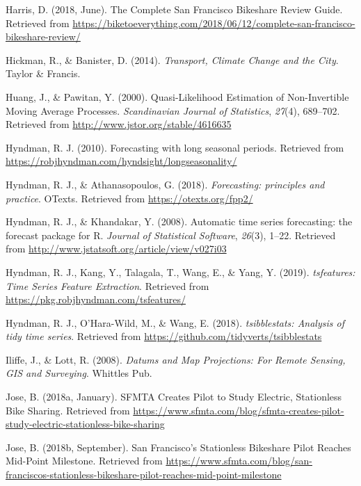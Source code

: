 \documentclass[12pt,oneside]{reedthesis}
\begin{document}
\hypertarget{ref-harris2018}{}
Harris, D. (2018, June). The Complete San Francisco Bikeshare Review
Guide. Retrieved from
\url{https://biketoeverything.com/2018/06/12/complete-san-francisco-bikeshare-review/}

\hypertarget{ref-hickman2014}{}
Hickman, R., \& Banister, D. (2014). \emph{Transport, Climate Change and
the City}. Taylor \& Francis.

\hypertarget{ref-huang2000}{}
Huang, J., \& Pawitan, Y. (2000). Quasi-Likelihood Estimation of
Non-Invertible Moving Average Processes. \emph{Scandinavian Journal of
Statistics}, \emph{27}(4), 689--702. Retrieved from
\url{http://www.jstor.org/stable/4616635}

\hypertarget{ref-hyndmanblog}{}
Hyndman, R. J. (2010). Forecasting with long seasonal periods. Retrieved
from \url{https://robjhyndman.com/hyndsight/longseasonality/}

\hypertarget{ref-hyndman2018fpp}{}
Hyndman, R. J., \& Athanasopoulos, G. (2018). \emph{Forecasting:
principles and practice}. OTexts. Retrieved from
\url{https://otexts.org/fpp2/}

\hypertarget{ref-forecast}{}
Hyndman, R. J., \& Khandakar, Y. (2008). Automatic time series
forecasting: the forecast package for R. \emph{Journal of Statistical
Software}, \emph{26}(3), 1--22. Retrieved from
\url{http://www.jstatsoft.org/article/view/v027i03}

\hypertarget{ref-tsfeatures}{}
Hyndman, R. J., Kang, Y., Talagala, T., Wang, E., \& Yang, Y. (2019).
\emph{tsfeatures: Time Series Feature Extraction}. Retrieved from
\url{https://pkg.robjhyndman.com/tsfeatures/}

\hypertarget{ref-tsibblestats}{}
Hyndman, R. J., O'Hara-Wild, M., \& Wang, E. (2018). \emph{tsibblestats:
Analysis of tidy time series}. Retrieved from
\url{https://github.com/tidyverts/tsibblestats}

\hypertarget{ref-iliffe2008}{}
Iliffe, J., \& Lott, R. (2008). \emph{Datums and Map Projections: For
Remote Sensing, GIS and Surveying}. Whittles Pub.

\hypertarget{ref-sfmta2018one}{}
Jose, B. (2018a, January). SFMTA Creates Pilot to Study Electric,
Stationless Bike Sharing. Retrieved from
\url{https://www.sfmta.com/blog/sfmta-creates-pilot-study-electric-stationless-bike-sharing}

\hypertarget{ref-sfmta2018two}{}
Jose, B. (2018b, September). San Francisco's Stationless Bikeshare Pilot
Reaches Mid-Point Milestone. Retrieved from
\url{https://www.sfmta.com/blog/san-franciscos-stationless-bikeshare-pilot-reaches-mid-point-milestone}
\end{document}
